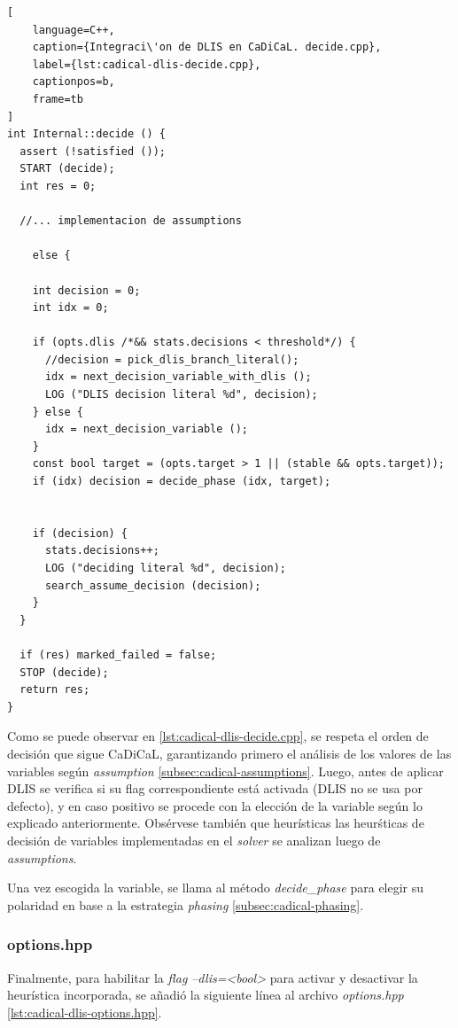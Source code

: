 \begin{lstlisting}[
    language=C++,
    caption={Integraci\'on de DLIS en CaDiCaL. decide.cpp},
    label={lst:cadical-dlis-decide.cpp},
    captionpos=b,
    frame=tb
]
int Internal::decide () {
  assert (!satisfied ());
  START (decide);
  int res = 0;

  //... implementacion de assumptions

    else {

    int decision = 0;
    int idx = 0;
    
    if (opts.dlis /*&& stats.decisions < threshold*/) {
      //decision = pick_dlis_branch_literal();
      idx = next_decision_variable_with_dlis ();
      LOG ("DLIS decision literal %d", decision);
    } else {
      idx = next_decision_variable ();
    }
    const bool target = (opts.target > 1 || (stable && opts.target));
    if (idx) decision = decide_phase (idx, target);
    

    if (decision) {
      stats.decisions++;
      LOG ("deciding literal %d", decision);
      search_assume_decision (decision);
    }
  }

  if (res) marked_failed = false;
  STOP (decide);
  return res;
}

\end{lstlisting}

Como se puede observar en \ref{lst:cadical-dlis-decide.cpp}, se respeta el orden de decisi\'on que sigue CaDiCaL, garantizando primero el an\'alisis de los valores de las variables seg\'un \textit{assumption} \ref{subsec:cadical-assumptions}. Luego, antes de aplicar DLIS se verifica si su flag correspondiente est\'a activada (DLIS no se usa por defecto), y en caso positivo se procede con la elecci\'on de la variable seg\'un lo explicado anteriormente. Obs\'ervese tambi\'en que heur\'isticas las heur\'sticas de decisi\'on de variables implementadas en el \textit{solver} se analizan luego de \textit{assumptions}.

Una vez escogida la variable, se llama al m\'etodo \textit{decide\_phase} para elegir su polaridad en base a la estrategia \textit{phasing} \ref{subsec:cadical-phasing}.

\subsubsection{options.hpp}
Finalmente, para habilitar la \textit{flag} \textit{--dlis=<bool>} para activar y desactivar la heur\'istica incorporada, se a\~nadi\'o la siguiente l\'inea al archivo \textit{options.hpp} \ref{lst:cadical-dlis-options.hpp}.

